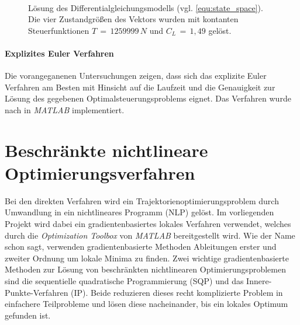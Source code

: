 \begin{figure}[htbp]
    \centering 
    \qquad
     \\

    \qquad
    \caption{Lösung des Differentialgleichungsmodells (vgl. \eqref{equ:state_space}). Die vier Zustandgrößen des Vektors wurden mit kontanten Steuerfunktionen \(T\,=\,1259999\,N\) und \(C_L\,=\,1,49\) gelöst.} %
\end{figure}


\paragraph{Explizites Euler Verfahren}
Die vorangeganenen Untersuchungen zeigen, dass sich das explizite Euler Verfahren am Besten mit Hinsicht auf die Laufzeit und die Genauigkeit zur Lösung des gegebenen Optimalsteuerungsproblems eignet. Das Verfahren wurde nach \cite{Brokate2016} in \textit{MATLAB} implementiert.

\section{Beschränkte nichtlineare Optimierungsverfahren}
Bei den direkten Verfahren wird ein Trajektorienoptimierungsproblem durch Umwandlung in ein nichtlineares Programm (NLP) gelöst. Im vorliegenden Projekt wird dabei ein gradientenbasiertes lokales Verfahren verwendet, welches durch die \textit{Optimization Toolbox} von \textit{MATLAB} bereitgestellt wird. Wie der Name schon sagt, verwenden gradientenbasierte Methoden Ableitungen erster und zweiter Ordnung um lokale Minima zu finden. Zwei wichtige gradientenbasierte Methoden zur Lösung von beschränkten nichtlinearen Optimierungsproblemen sind die sequentielle quadratische Programmierung (SQP) und das Innere-Punkte-Verfahren (IP). Beide reduzieren dieses recht komplizierte Problem in einfachere Teilprobleme und lösen diese nacheinander, bis ein lokales Optimum gefunden ist.

